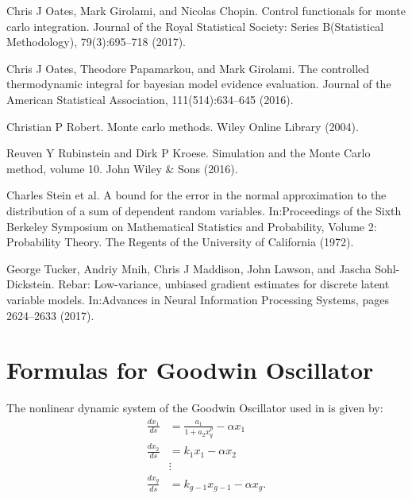 \documentclass[runningheads]{llncs}
\begin{document}
\begin{thebibliography}{18}
Chris J Oates, Mark Girolami, and Nicolas Chopin. Control functionals for monte carlo integration. Journal of the Royal Statistical Society: Series B(Statistical Methodology), 79(3):695–718 (2017).

Chris J Oates, Theodore Papamarkou, and Mark Girolami. The controlled
thermodynamic integral for bayesian model evidence evaluation. Journal of the American Statistical Association, 111(514):634–645 (2016).

Christian P Robert. Monte carlo methods. Wiley Online Library (2004).

Reuven Y Rubinstein and Dirk P Kroese. Simulation and the Monte Carlo
method, volume 10. John Wiley \& Sons (2016).

Charles Stein et al. A bound for the error in the normal approximation to the distribution of a sum of dependent random variables. In:Proceedings of the Sixth Berkeley Symposium on Mathematical Statistics and Probability, Volume 2: Probability Theory. The Regents of the University of California
(1972).

George Tucker, Andriy Mnih, Chris J Maddison, John Lawson, and Jascha
Sohl-Dickstein. Rebar: Low-variance, unbiased gradient estimates for discrete latent variable models. In:Advances in Neural Information Processing Systems, pages 2624–2633 (2017).
\end{thebibliography}

\appendix

\section{Formulas for Goodwin Oscillator}
The nonlinear dynamic system of the Goodwin Oscillator used in \cite{oates2016controlled} is given by:
\begin{equation}
\begin{split}
\frac{d x_1}{d s} &= \frac{a_1}{1+ a_2 x_g^{\rho}} - \alpha x_1 \\
\frac{d x_2}{d s} &= k_1x_1 - \alpha x_2 \\
    & \vdots \\
\frac{d x_g}{d s} &= k_{g-1} x_{g-1} - \alpha x_g.
\end{split}
\end{equation}
\end{document}
